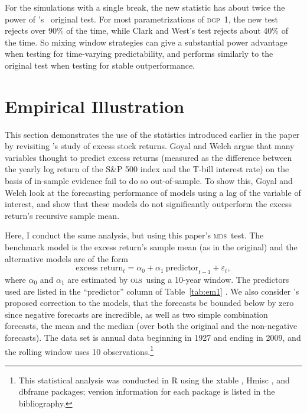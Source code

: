 \documentclass[12pt,fleqn]{article}
\newcommand\citepos[2][]{\citeauthor{#2}'s \citeyearpar[#1]{#2}}
\newcommand\poscw{\citeauthor{ClW:06}'s \citeyearpar{ClW:06,ClW:07}}
\theoremstyle{definition}
\newcommand{\dgp}{\textsc{dgp}}
\newcommand{\mds}{\textsc{mds}}
\newcommand{\ols}{\textsc{ols}}
\begin{document}
For the simulations with a single break, the new statistic has about
twice the power of \poscw\ original test.  For most parametrizations
of \dgp\ 1, the new test rejects over 90\% of the time, while Clark
and West's test rejects about 40\% of the time.  So mixing window
strategies can give a substantial power advantage when testing for
time-varying predictability, and performs similarly to the original
test when testing for stable outperformance.

\section{Empirical Illustration}\label{sec:3}

This section demonstrates the use of the statistics introduced earlier
in the paper by revisiting \citepos{GoW:08} study of excess stock
returns.  Goyal and Welch argue that many variables thought to predict
excess returns (measured as the difference between the yearly log
return of the S\&P 500 index and the T-bill interest rate) on the
basis of in-sample evidence fail to do so out-of-sample.  To show
this, Goyal and Welch look at the forecasting performance of models
using a lag of the variable of interest, and show that these models do
not significantly outperform the excess return's recursive sample mean.

Here, I conduct the same analysis, but using this paper's \mds\ test.
The benchmark model is the excess return's sample mean (as in the
original) and the alternative models are of the form
\[\text{excess return}_{t} = \alpha_{0} + \alpha_{1}\ 
\text{predictor}_{t-1} + \varepsilon_{t},\] where $\alpha_{0}$ and
$\alpha_{1}$ are estimated by \ols\ using a 10-year window.  The
predictors used are listed in the ``predictor'' column of
Table~\ref{tab:em1} \citep[see][for a detailed description of the
variables]{GoW:08}.  We also consider \citepos{CaT:08} proposed
correction to the models, that the forecasts be bounded below by zero
since negative forecasts are incredible, as well as two simple
combination forecasts, the mean and the median (over both the original
and the non-negative forecasts).  The data set is annual data
beginning in 1927 and ending in 2009, and the rolling window uses 10
observations.\footnote{This statistical analysis was conducted in R
  \citep{R:2-13-0} using the xtable \citep{Dah:09}, Hmisc
  \citep{Har:10}, and dbframe \citep{Cal:10b} packages; version
  information for each package is listed in the bibliography.}
\end{document}
